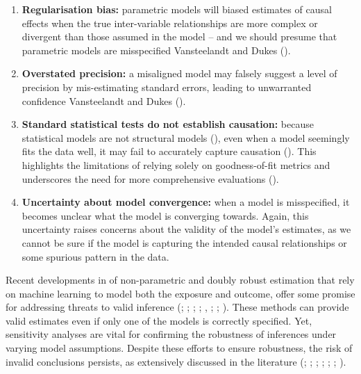 \documentclass[
  singlecolumn,
  9pt]{article}
\begin{document}
\begin{enumerate}
\def\labelenumi{\alph{enumi}.}
\item
  \textbf{Regularisation bias:} parametric models will biased estimates
  of causal effects when the true inter-variable relationships are more
  complex or divergent than those assumed in the model -- and we should
  presume that parametric models are misspecified Vansteelandt and Dukes
  ().
\item
  \textbf{Overstated precision:} a misaligned model may falsely suggest
  a level of precision by mis-estimating standard errors, leading to
  unwarranted confidence Vansteelandt and Dukes
  ().
\item
  \textbf{Standard statistical tests do not establish causation:}
  because statistical models are not structural models
  (), even when a
  model seemingly fits the data well, it may fail to accurately capture
  causation (). This
  highlights the limitations of relying solely on goodness-of-fit
  metrics and underscores the need for more comprehensive evaluations
  ().
\item
  \textbf{Uncertainty about model convergence:} when a model is
  misspecified, it becomes unclear what the model is converging towards.
  Again, this uncertainty raises concerns about the validity of the
  model's estimates, as we cannot be sure if the model is capturing the
  intended causal relationships or some spurious pattern in the data.
\end{enumerate}

Recent developments in of non-parametric and doubly robust estimation
that rely on machine learning to model both the exposure and outcome,
offer some promise for addressing threats to valid inference
(;
;
;
;
,
; ; ). These
methods can provide valid estimates even if only one of the models is
correctly specified. Yet, sensitivity analyses are vital for confirming
the robustness of inferences under varying model assumptions. Despite
these efforts to ensure robustness, the risk of invalid conclusions
persists, as extensively discussed in the literature
(;
;
;
;
;
;
).
\end{document}
